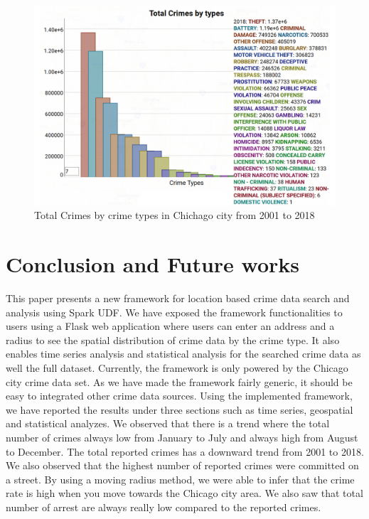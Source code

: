 \begin{figure}[htb]
	\centering\includegraphics[width=\columnwidth]{images/stat2.jpg}
	\caption{Total Crimes by crime types in Chichago city from 2001
        to 2018}\label{fig:year-top10crimes-local-stat2}
\end{figure}

\section{Conclusion and Future works} 

This paper presents a new framework for location based crime data
search and analysis using Spark UDF. We have exposed the framework
functionalities to users using a Flask web application where users can
enter an address and a radius to see the spatial distribution of crime
data by the crime type. It also enables time series analysis and
statistical analysis for the searched crime data as well the full
dataset. Currently, the framework is only powered by the Chicago city
crime data set. As we have made the framework fairly generic, it
should be easy to integrated other crime data sources. Using the
implemented framework, we have reported the results under three
sections such as time series, geospatial and statistical analyzes. We
observed that there is a trend where the total number of crimes always
low from January to July and always high from August to December. The
total reported crimes has a downward trend from 2001 to 2018. We also
observed that the highest number of reported crimes were committed on
a street. By using a moving radius method, we were able to infer that
the crime rate is high when you move towards the Chicago city area. We
also saw that total number of arrest are always really low compared to
the reported crimes.

